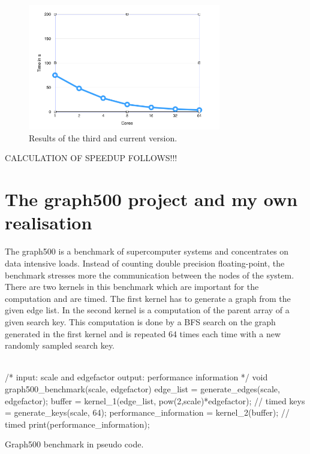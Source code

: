 \documentclass[12pt,a4paper]{article}
\begin{document}
\begin{figure}[H]
   \centering
   \includegraphics[width=0.75\textwidth]{allvisited}
   \caption{Results of the third and current version.}
   \label{fig:allvisited}
\end{figure}

CALCULATION OF SPEEDUP FOLLOWS!!!

\section{The graph500 project and my own realisation}
\label{sec:graph500}

The graph500 \cite{graph500} is a benchmark of supercomputer systems and concentrates on data intensive loads. Instead of counting double precision floating-point, the benchmark stresses more the communication between the nodes of the system. There are two kernels in this benchmark which are important for the computation and are timed. The first kernel has to generate a graph from the given edge list. In the second kernel is a computation of the parent array of a given search key. This computation is done by a BFS search on the graph generated in the first kernel and is repeated 64 times each time with a new randomly sampled search key.\\
\\
\begin{listing}[H]
\begin{ccode}
/*
input: scale and edgefactor
output: performance information
*/
void graph500_benchmark(scale, edgefactor){
	edge_list = generate_edges(scale, edgefactor);
	buffer = kernel_1(edge_list, pow(2,scale)*edgefactor); // timed
	keys = generate_keys(scale, 64);
	performance_information = kernel_2(buffer); // timed
	print(performance_information);
}
\end{ccode}
\caption{Graph500 benchmark in pseudo code.}
\label{lst:graph500}
\end{listing}
\end{document}
